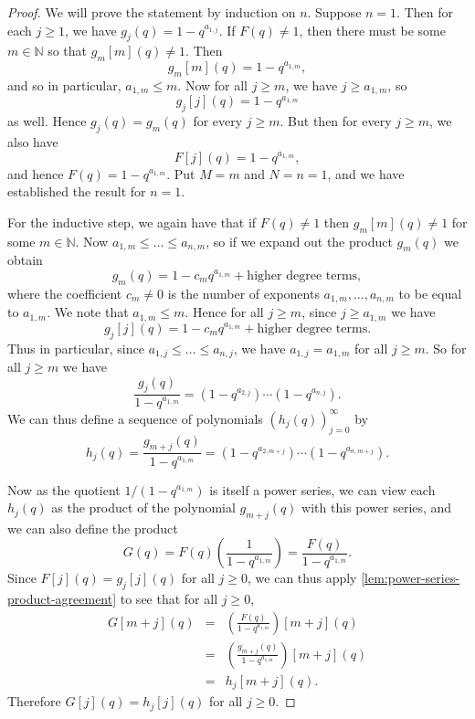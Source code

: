 \documentclass[11pt]{amsart}
\theoremstyle{plain}
\theoremstyle{definition}
\newcommand{\N}{\mathbb{N}}
\numberwithin{equation}{subsection}
\begin{document}
\begin{proof}
	We will prove the statement by induction on $n$. 
	Suppose $n = 1$. Then for each $j \geq 1$, we have $
	g_j(q) = 1 - q^{a_{1,j}}$.
	If $F(q) \neq 1$, then there must be some $m \in \N$ so that $g_m[m](q) \neq 1$. Then \[ g_m[m](q) = 1 - q^{a_{1,m}},\] and so in particular, $a_{1,m} \leq m$.
	Now for all $j \geq m$, we have $j \geq a_{1,m}$, so
	\[
	g_j[j](q) = 1 - q^{a_{1,m}}
	\]
	as well. Hence $g_j(q) = g_m(q)$ for every $j \geq m$. But then for every $j \geq m$, we also have
	\[
	F[j](q) = 1 - q^{a_{1,m}},
	\]
	and hence $F(q) = 1 - q^{a_{1,m}}$. Put $M = m$ and $N = n = 1$, and we have established the result for $n = 1$.
	
	For the inductive step, we again have that if $F(q) \neq 1$ then $g_m[m](q) \neq 1$ for some $m \in \N$. Now $a_{1,m} \leq \dots \leq a_{n,m}$, so if we expand out the product $g_m(q)$ we obtain
	\[
	g_m(q) = 1 - c_m q^{a_{1,m}} + \mbox{higher degree terms},
	\]
	where the coefficient $c_m \neq 0$ is the number of exponents $a_{1,m},\dots,a_{n,m}$ to be equal to $a_{1,m}$. We note that $a_{1,m} \leq m$. Hence for all $j \geq m$, since $j \geq a_{1,m}$ we have
	\[
	g_j[j](q) = 1 - c_m q^{a_{1,m}} + \mbox{higher degree terms}.
	\]
	Thus in particular, since $a_{1,j} \leq \dots \leq a_{n,j}$, we have $a_{1,j} = a_{1,m}$ for all $j \geq m$.
	So for all $j \geq m$ we have 
	\[
	\frac{g_j(q)}{1-q^{a_{1,m}}} =
	(1 - q^{a_{2,j}})
	\cdots
	(1 - q^{a_{n,j}}).
	\]
	We can thus define a sequence of polynomials $(h_j(q))_{j=0}^\infty$ by
	\[
	h_j(q) = \frac{g_{m+j}(q)}{1-q^{a_{1,m}}} =
	(1 - q^{a_{2,m+j}})
	\cdots
	(1 - q^{a_{n,m+j}}).
	\]
	
	Now as the quotient $1/(1-q^{a_{1,m}})$ 
	is itself a power series, we can view each $h_j(q)$ as the product of the polynomial $g_{m+j}(q)$ with this power series, and we can also define the product 
	\[
	G(q) = F(q) \left(
	\frac{1}{1-q^{a_{1,m}}} \right) = \frac{F(q)}{1-q^{a_{1,m}}}.
	\]
	Since $F[j](q) = g_j[j](q)$ for all $j \geq 0$, we can thus apply \cref{lem:power-series-product-agreement} to see that for all $j \geq 0$, 
	\begin{eqnarray*}
	G[m+j](q)  & = & \left( 
	\frac{F(q)}{1-q^{a_{1,m}}} 
	\right)
	[m+j](q) \\
	& = &
	\left( 
	\frac{g_{m+j}(q)}{1-q^{a_{1,m}}}
	\right)
	[m+j](q) \\ & = & h_j[m+j](q).
	\end{eqnarray*}
	Therefore $G[j](q) = h_j[j](q)$ for all $j \geq 0$. 
	

\end{proof}
\end{document}
